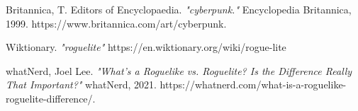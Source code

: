 \documentclass[10pt,conference,onecolumn,compsoc]{IEEEtran}
\begin{document}



\begin{thebibliography}{1}

Britannica, T. Editors of Encyclopaedia. \emph{"cyberpunk."} Encyclopedia Britannica, 1999. https://www.britannica.com/art/cyberpunk.

Wiktionary. \emph{"roguelite"}
https://en.wiktionary.org/wiki/rogue-lite

whatNerd, Joel Lee. \emph{"What’s a Roguelike vs. Roguelite? Is the Difference Really That Important?"} whatNerd, 2021. https://whatnerd.com/what-is-a-roguelike-roguelite-difference/.

\end{thebibliography}

\end{document}
